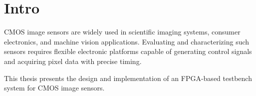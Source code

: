 \section{Intro}

CMOS image sensors are widely used in scientific imaging systems,
consumer electronics, and machine vision applications. Evaluating
and characterizing such sensors requires flexible electronic
platforms capable of generating control signals and acquiring pixel
data with precise timing.

This thesis presents the design and implementation of an FPGA-based
testbench system for CMOS image sensors.